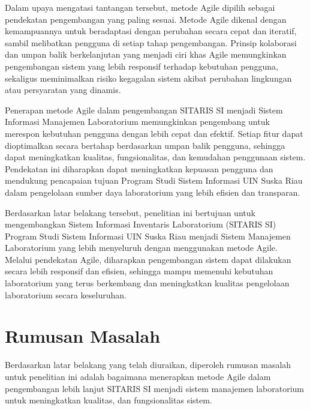 Dalam upaya mengatasi tantangan tersebut, metode Agile dipilih sebagai pendekatan pengembangan yang paling sesuai. Metode Agile dikenal dengan kemampuannya untuk beradaptasi dengan perubahan secara cepat dan iteratif, sambil melibatkan pengguna di setiap tahap pengembangan. Prinsip kolaborasi dan umpan balik berkelanjutan yang menjadi ciri khas Agile memungkinkan pengembangan sistem yang lebih responsif terhadap kebutuhan pengguna, sekaligus meminimalkan risiko kegagalan sistem akibat perubahan lingkungan atau persyaratan yang dinamis.

Penerapan metode Agile dalam pengembangan SITARIS SI menjadi Sistem Informasi Manajemen Laboratorium memungkinkan pengembang untuk merespon kebutuhan pengguna dengan lebih cepat dan efektif. Setiap fitur dapat dioptimalkan secara bertahap berdasarkan umpan balik pengguna, sehingga dapat meningkatkan kualitas, fungsionalitas, dan kemudahan penggunaan sistem. Pendekatan ini diharapkan dapat meningkatkan kepuasan pengguna dan mendukung pencapaian tujuan Program Studi Sistem Informasi UIN Suska Riau dalam pengelolaan sumber daya laboratorium yang lebih efisien dan transparan.

Berdasarkan latar belakang tersebut, penelitian ini bertujuan untuk mengembangkan Sistem Informasi Inventaris Laboratorium (SITARIS SI) Program Studi Sistem Informasi UIN Suska Riau menjadi Sistem Manajemen Laboratorium yang lebih menyeluruh dengan menggunakan metode Agile. Melalui pendekatan Agile, diharapkan pengembangan sistem dapat dilakukan secara lebih responsif dan efisien, sehingga mampu memenuhi kebutuhan laboratorium yang terus berkembang dan meningkatkan kualitas pengelolaan laboratorium secara keseluruhan.

\section{Rumusan Masalah}
Berdasarkan latar belakang yang telah diuraikan, diperoleh rumusan masalah untuk penelitian ini adalah bagaimana menerapkan metode Agile dalam pengembangan lebih lanjut SITARIS SI menjadi sistem manajemen laboratorium untuk meningkatkan kualitas, dan fungsionalitas sistem.

